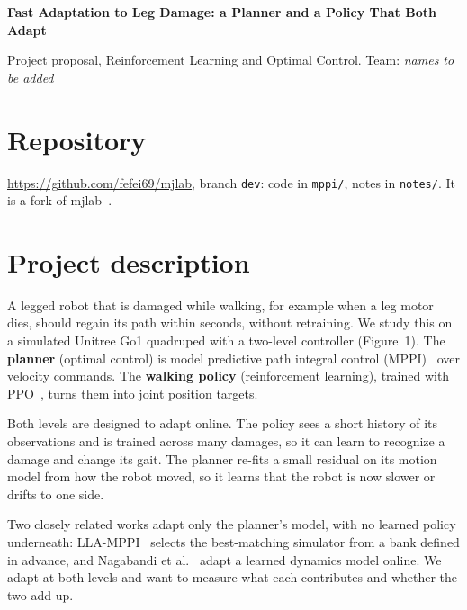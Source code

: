 \documentclass[10pt]{article}
\begin{document}
\begin{center}
  {\large\bfseries Fast Adaptation to Leg Damage: a Planner and a Policy
  That Both Adapt\par}
  \vspace{3pt}
  Project proposal, Reinforcement Learning and Optimal Control.
  Team: \emph{names to be added}
\end{center}

\section{Repository}

\url{https://github.com/fefei69/mjlab}, branch \texttt{dev}: code in
\texttt{mppi/}, notes in \texttt{notes/}. It is a fork of mjlab~\cite{mjlab}.

\section{Project description}

A legged robot that is damaged while walking, for example when a leg motor
dies, should regain its path within seconds, without retraining. We study this
on a simulated Unitree Go1 quadruped with a two-level controller (Figure~1).
The \textbf{planner} (optimal control) is model predictive path integral
control (MPPI)~\cite{mppi} over velocity commands. The \textbf{walking policy}
(reinforcement learning), trained with PPO~\cite{ppo}, turns them into joint
position targets.

Both levels are designed to adapt online. The policy sees a short history of
its observations and is trained across many damages, so it can learn to
recognize a damage and change its gait. The planner re-fits a small residual
on its motion model from how the robot moved, so it learns that the robot is
now slower or drifts to one side.

Two closely related works adapt only the planner's model, with no learned
policy underneath: LLA-MPPI~\cite{llampi} selects the best-matching simulator
from a bank defined in advance, and Nagabandi et al.~\cite{nagabandi} adapt a
learned dynamics model online. We adapt at both levels and want to measure
what each contributes and whether the two add up.
\end{document}
